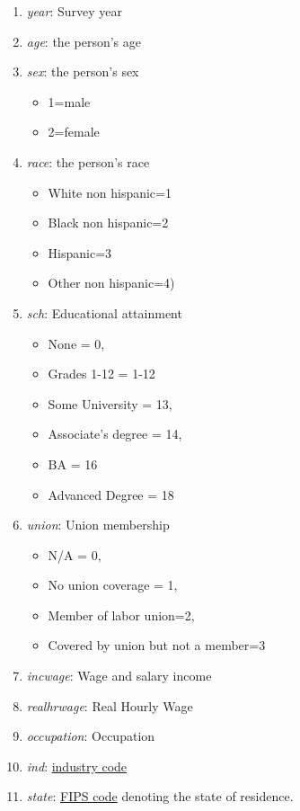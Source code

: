 \documentclass[
  letterpaper,
  DIV=11,
  numbers=noendperiod]{scrreprt}
\providecommand{\tightlist}{%
  \setlength{\itemsep}{0pt}\setlength{\parskip}{0pt}}\usepackage{longtable,booktabs,array}
\begin{document}
\begin{enumerate}
\def\labelenumi{\arabic{enumi}.}
\tightlist
\item
  \emph{year}: Survey year
\item
  \emph{age}: the person's age
\item
  \emph{sex}: the person's sex

  \begin{itemize}
  \tightlist
  \item
    1=male
  \item
    2=female
  \end{itemize}
\item
  \emph{race}: the person's race

  \begin{itemize}
  \tightlist
  \item
    White non hispanic=1
  \item
    Black non hispanic=2
  \item
    Hispanic=3
  \item
    Other non hispanic=4)
  \end{itemize}
\item
  \emph{sch}: Educational attainment

  \begin{itemize}
  \tightlist
  \item
    None = 0,
  \item
    Grades 1-12 = 1-12
  \item
    Some University = 13,
  \item
    Associate's degree = 14,
  \item
    BA = 16
  \item
    Advanced Degree = 18
  \end{itemize}
\item
  \emph{union}: Union membership

  \begin{itemize}
  \tightlist
  \item
    N/A = 0,
  \item
    No union coverage = 1,
  \item
    Member of labor union=2,
  \item
    Covered by union but not a member=3
  \end{itemize}
\item
  \emph{incwage}: Wage and salary income
\item
  \emph{realhrwage}: Real Hourly Wage
\item
  \emph{occupation}: Occupation
\item
  \emph{ind}:
  \href{https://www.census.gov/naics/?58967?yearbck=2002}{industry code}
\item
  \emph{state}:
  \href{https://www.bls.gov/respondents/mwr/electronic-data-interchange/appendix-d-usps-state-abbreviations-and-fips-codes.htm}{FIPS
  code} denoting the state of residence.
\end{enumerate}
\end{document}

